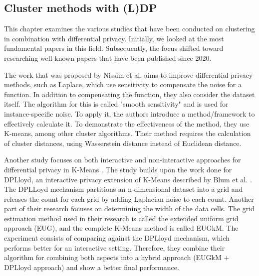 \subsection{Cluster methods with (L)DP}
This chapter examines the various studies that have been conducted on clustering in combination with differential privacy.
Initially, we looked at the most fundamental papers in this field. Subsequently, the focus shifted toward researching well-known papers that have been published since 2020.

The work that was proposed by Nissim et al. aims to improve differential privacy methods, such as Laplace, which use sensitivity to compensate the noise for a function.
In addition to compensating the function, they also consider the dataset itself.
The algorithm for this is called "smooth sensitivity" and is used for instance-specific noise.
To apply it, the authors introduce a method/framework to effectively calculate it.
To demonstrate the effectiveness of the method, they use K-means, among other cluster algorithms.
Their method requires the calculation of cluster distances, using Wasserstein distance instead of Euclidean distance.

Another study focuses on both interactive and non-interactive approaches for differential privacy in K-Means \citep{su_differentially_2015-1}.
The study builds upon the work done for DPLloyd, an interactive privacy extension of K-Means described by Blum et al. \citep{blum_practical_2005}.
The DPLLoyd mechanism partitions an n-dimensional dataset into a grid and releases the count for each grid by adding Laplacian noise to each count.
Another part of their research focuses on determining the width of the data cells.
The grid estimation method used in their research is called the extended uniform grid approach (EUG), and the complete K-Means method is called EUGkM.
The experiment consists of comparing against the DPLloyd mechanism, which performs better for an interactive setting.
Therefore, they combine their algorithm for combining both aspects into a hybrid approach (EUGkM + DPLloyd approach) and show a better final performance.

